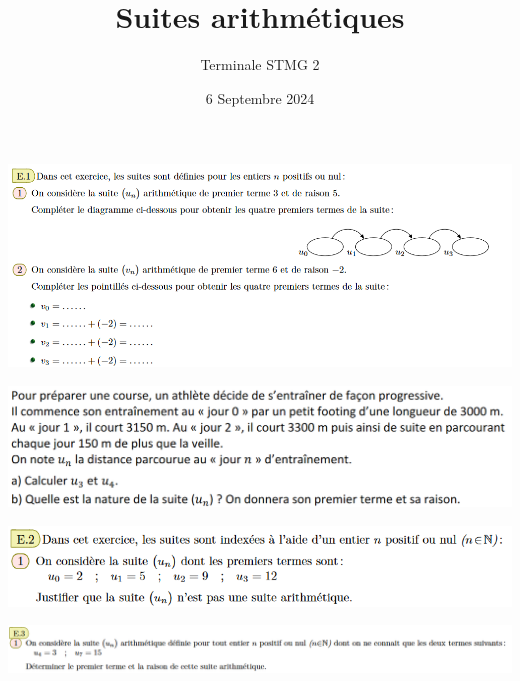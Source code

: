 \documentclass{article}
\title{Suites arithmétiques}
\date{6 Septembre 2024}
\author{Terminale STMG 2}
\begin{document}
\maketitle
\begin{center}
\includegraphics[width=\textwidth]{Exo1.png}

\vspace*{0.5cm}
\includegraphics[width=\textwidth]{Exo4.png}

\vspace*{0.5cm}
\includegraphics[width=\textwidth]{Exo2.png}


\vspace*{0.5cm}
\includegraphics[width=\textwidth]{Exo3.png}

\end{center}
\end{document}
